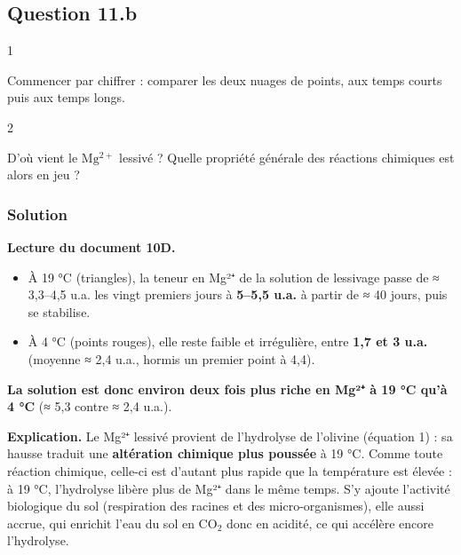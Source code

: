 \documentclass[11pt,a4paper]{article}
\providecommand{\tightlist}{\setlength{\itemsep}{0pt}\setlength{\parskip}{0pt}}
\begin{document}
\hypertarget{question-11.b}{%
\subsection{Question 11.b}\label{question-11.b}}

\begin{indication}{1}

Commencer par chiffrer : comparer les deux nuages de points, aux temps courts puis aux temps longs.

\end{indication}

\begin{indication}{2}

D'où vient le \(\mathrm{Mg^{2+}}\) lessivé ? Quelle propriété générale des réactions chimiques est alors en jeu ?

\end{indication}

\hypertarget{solution-37}{%
\subsubsection{Solution}\label{solution-37}}

\textbf{Lecture du document 10D.}

\begin{itemize}
\tightlist
\item
  À 19 °C (triangles), la teneur en Mg²⁺ de la solution de lessivage passe de ≈ 3,3--4,5 u.a. les vingt premiers jours à \textbf{5--5,5 u.a.} à partir de ≈ 40 jours, puis se stabilise.
\item
  À 4 °C (points rouges), elle reste faible et irrégulière, entre \textbf{1,7 et 3 u.a.} (moyenne ≈ 2,4 u.a., hormis un premier point à 4,4).
\end{itemize}

\textbf{La solution est donc environ deux fois plus riche en Mg²⁺ à 19 °C qu'à 4 °C} (≈ 5,3 contre ≈ 2,4 u.a.).

\textbf{Explication.} Le Mg²⁺ lessivé provient de l'hydrolyse de l'olivine (équation 1) : sa hausse traduit une \textbf{altération chimique plus poussée} à 19 °C. Comme toute réaction chimique, celle-ci est d'autant plus rapide que la température est élevée : à 19 °C, l'hydrolyse libère plus de Mg²⁺ dans le même temps. S'y ajoute l'activité biologique du sol (respiration des racines et des micro-organismes), elle aussi accrue, qui enrichit l'eau du sol en \(\mathrm{CO_2}\) donc en acidité, ce qui accélère encore l'hydrolyse.
\end{document}
